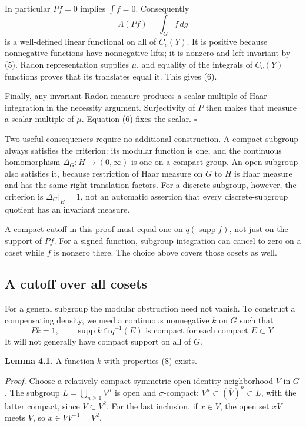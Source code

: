 \documentclass[
  english,
  11pt,
  a4paper,
]{article}
\begin{document}
In particular \(Pf=0\) implies \(\int f=0\). Consequently
\[\Lambda(Pf)=\int_G f\,dg\] is a well-defined linear functional on all
of \(C_c(Y)\). It is positive because nonnegative functions have
nonnegative lifts; it is nonzero and left invariant by (5). Radon
representation supplies \(\mu\), and equality of the integrals of
\(C_c(Y)\) functions proves that its translates equal it. This gives
(6).

Finally, any invariant Radon measure produces a scalar multiple of Haar
integration in the necessity argument. Surjectivity of \(P\) then makes
that measure a scalar multiple of \(\mu\). Equation (6) fixes the
scalar. \(\square\)

Two useful consequences require no additional construction. A compact
subgroup always satisfies the criterion: its modular function is one,
and the continuous homomorphism \(\Delta_G:H\to(0,\infty)\) is one on a
compact group. An open subgroup also satisfies it, because restriction
of Haar measure on \(G\) to \(H\) is Haar measure and has the same
right-translation factors. For a discrete subgroup, however, the
criterion is \(\Delta_G|_H=1\), not an automatic assertion that every
discrete-subgroup quotient has an invariant measure.

A compact cutoff in this proof must equal one on
\(q(\operatorname{supp}f)\), not just on the support of \(Pf\). For a
signed function, subgroup integration can cancel to zero on a coset
while \(f\) is nonzero there. The choice above covers those cosets as
well.

\subsection{A cutoff over all
cosets}\label{quotient-measures-and-weils-integration-formula--a-cutoff-over-all-cosets}

For a general subgroup the modular obstruction need not vanish. To
construct a compensating density, we need a continuous nonnegative \(k\)
on \(G\) such that \[Pk=1,\qquad
\operatorname{supp}k\cap q^{-1}(E)\text{ is compact for each compact }E\subset Y.
\tag{8}\] It will not generally have compact support on all of \(G\).

\textbf{Lemma 4.1.} A function \(k\) with properties (8) exists.

\emph{Proof.} Choose a relatively compact symmetric open identity
neighborhood \(V\) in \(G\). The subgroup \(L=\bigcup_{n\geq1}V^n\) is
open and \(\sigma\)-compact: \(V^n\subset(\overline V)^n\subset L\),
with the latter compact, since \(\overline V\subset V^2\). For the last
inclusion, if \(x\in\overline V\), the open set \(xV\) meets \(V\), so
\(x\in VV^{-1}=V^2\).
\end{document}
